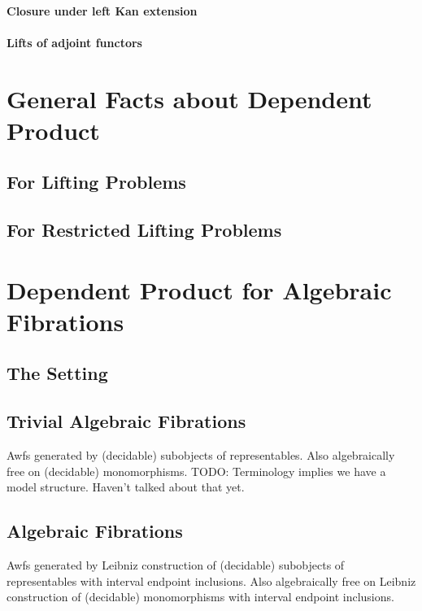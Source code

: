 \documentclass[reqno,10pt,a4paper,oneside]{amsart}
\begin{document}
\begin{enumerate}
\paragraph{Closure under left Kan extension}

\paragraph{Lifts of adjoint functors}

\section{General Facts about Dependent Product}

\subsection{For Lifting Problems}

\subsection{For Restricted Lifting Problems}

\section{Dependent Product for Algebraic Fibrations}

\subsection{The Setting}

\subsection{Trivial Algebraic Fibrations}

Awfs generated by (decidable) subobjects of representables.
Also algebraically free on (decidable) monomorphisms.
TODO: Terminology implies we have a model structure.
Haven't talked about that yet.

\subsection{Algebraic Fibrations}

Awfs generated by Leibniz construction of (decidable) subobjects of representables with interval endpoint inclusions.
Also algebraically free on Leibniz construction of (decidable) monomorphisms with interval endpoint inclusions.


\end{enumerate}
\end{document}

